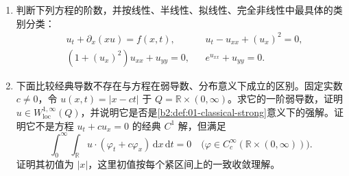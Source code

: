 \begin{exercise}\label{b2:ex:01-pde-classification-weak-wave}
\begin{enumerate}
 \item\label{b2:item:01-pde-classification} 判断下列方程的阶数，并按线性、半线性、拟线性、完全非线性中最具体的类别分类：
 \[
 \begin{aligned}
 &u_t+\partial_x(xu)=f(x,t),
 &&u_t-u_{xx}+(u_x)^2=0,\\
 &(1+(u_x)^2)u_{xx}+u_{yy}=0,
 &&e^{u_{xx}}+u_{yy}=0.
 \end{aligned}
 \]
 \item\label{b2:item:01-pde-corner-wave} 下面比较经典导数不存在与方程在弱导数、分布意义下成立的区别。固定实数 \(c\ne0\)，令 \(u(x,t)=|x-ct|\) 于 \(Q=\mathbb R\times(0,\infty)\)。求它的一阶弱导数，证明 \(u\in W^{1,\infty}_{\mathrm{loc}}(Q)\)，并说明它是否是\cref{b2:def:01-classical-strong}意义下的强解。证明它不是方程 \(u_t+c u_x=0\) 的经典 \(C^1\) 解，但满足
 \[
 \int_0^\infty\int_{\mathbb R}
 u\cdot(\varphi_t+c\varphi_x)\,\mathrm dx\,\mathrm dt=0
 \quad\bigl(\varphi\in C_c^\infty(\mathbb R\times(0,\infty))\bigr).
 \]
 证明其初值为 \(|x|\)，这里初值按每个紧区间上的一致收敛理解。
\end{enumerate}
\end{exercise}
